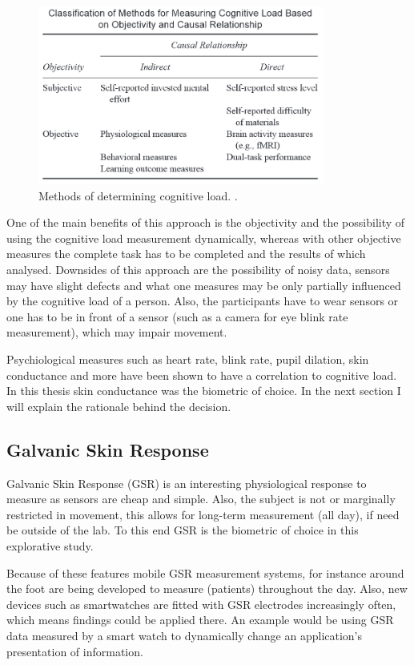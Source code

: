 \documentclass[11pt,leqno,a4paper]{report} %
\begin{document}
\begin{figure}[H]
  \centering   
    \includegraphics[width=0.84\textwidth]{meas.png}
  \caption{Methods of determining cognitive load. \citep{brunken2003direct}.}
\end{figure}


One of the main benefits of this approach is the objectivity and the possibility of using the cognitive load measurement dynamically, whereas with other objective measures the complete task has to be completed and the results of which analysed.
Downsides of this approach are the possibility of noisy data, sensors may have slight defects and what one measures may be only partially influenced by the cognitive load of a person. Also, the participants have to wear sensors or one has to be in front of a sensor (such as a camera for eye blink rate measurement), which may impair movement. 

Psychiological measures such as heart rate, blink rate, pupil dilation, skin conductance and more have been shown to have a correlation to cognitive load. In this thesis skin conductance was the biometric of choice. In the next section I will explain the rationale behind the decision.


\subsection{Galvanic Skin Response}

Galvanic Skin Response (GSR) is an interesting physiological response to measure as sensors are cheap and simple. Also, the subject is not or marginally restricted in movement, this allows for long-term measurement (all day), if need be outside of the lab. To this end GSR is the biometric of choice in this explorative study.

Because of these features mobile GSR measurement systems, for instance around the foot \citep{Gravenhorst} are being developed to measure (patients) throughout the day. Also, new devices such as smartwatches are fitted with GSR electrodes increasingly often, which means findings could be applied there. An example would be using GSR data measured by a smart watch to dynamically change an application's presentation of information.
\end{document}

